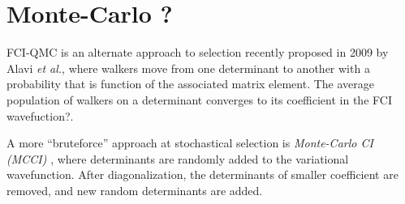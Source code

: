 \documentclass[./thesis.tex]{subfiles}
\begin{document}
\section{Monte-Carlo ?}
FCI-QMC is an alternate approach to selection recently proposed in 2009 by Alavi \textit{et al.}\cite{Booth_2009,Booth_2010,Cleland_2010}, where walkers move from one determinant to another with a probability that is function of the associated matrix element. \alert{The average population of walkers on a determinant converges to its coefficient in the FCI wavefuction?}.

A more ``bruteforce'' approach at stochastical selection is \emph{Monte-Carlo CI (MCCI)} \cite{Greer_1995,Greer_1998}, where determinants are randomly added to the variational wavefunction. After diagonalization, the determinants of smaller coefficient are removed, and new random determinants are added.
\end{document}
